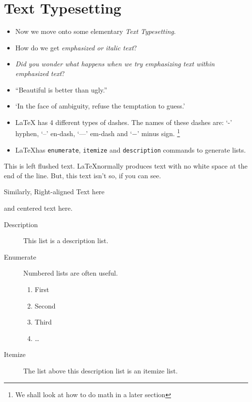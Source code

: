\documentclass[11pt,a4paper,twoside]{article}
\begin{document}
\section{Text Typesetting}
\begin{itemize}
\item Now we move onto some elementary \emph{Text Typesetting}.

\item How do we get \emph{emphasized or italic text}?

\item \emph{Did you wonder what happens when we try \emph{emphasizing text} within \emph{emphasized text}}?

\item ``Beautiful is better than ugly.''

\item `In the face of ambiguity, refuse the temptation to guess.'

\item LaTeX has 4 different types of dashes. The names of these dashes are: `-' hyphen, `--' en-dash, `---' em-dash and `$-$' minus sign. \footnote{We shall look at how to do math in a later section}

\item \LaTeX has \verb+enumerate+, \verb+itemize+ and \verb+description+ commands to generate lists. 

\end{itemize}

\begin{flushleft}This is left flushed text. \LaTeX normally produces text with no white space at the end of the line. But, this text isn't so, if you can see.\end{flushleft}
\begin{flushright}Similarly, Right-aligned Text here\end{flushright}
\begin{center} and centered text here.\end{center}

\begin{description}
  \item[Description] This list is a description list. 
  \item[Enumerate] Numbered lists are often useful.
    \begin{enumerate}
    \item First
    \item Second
    \item Third
    \item \ldots
    \end{enumerate}
  \item[Itemize] The list above this description list is an itemize list.
\end{description}
\end{document}

